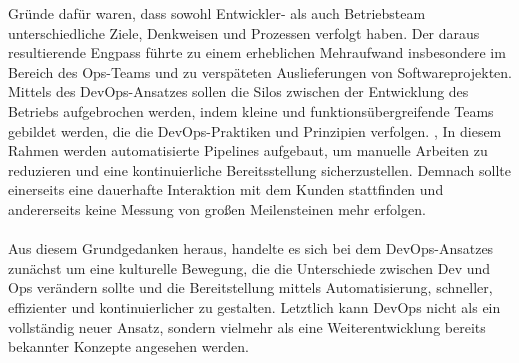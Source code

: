 Gründe dafür waren, dass sowohl Entwickler- als auch Betriebsteam unterschiedliche Ziele, Denkweisen und Prozessen verfolgt haben. \cite{wettinger_streamlining_2016} Der daraus resultierende Engpass führte zu einem erheblichen Mehraufwand insbesondere im Bereich des Ops-Teams und zu verspäteten Auslieferungen von Softwareprojekten. Mittels des DevOps-Ansatzes sollen die Silos zwischen der Entwicklung des Betriebs aufgebrochen werden, indem kleine und funktionsübergreifende Teams gebildet werden, die die DevOps-Praktiken und Prinzipien verfolgen. \cite{ebert_devops_2016}, \cite{wiedemann_research_2019} In diesem Rahmen werden automatisierte Pipelines aufgebaut, um manuelle Arbeiten zu reduzieren und eine kontinuierliche Bereitsstellung sicherzustellen. \cite[S.3,5]{verona_practical_2016} Demnach sollte einerseits eine dauerhafte Interaktion mit dem Kunden stattfinden und andererseits keine Messung von großen Meilensteinen mehr erfolgen. \cite[S.5]{sharma_devops_2017}\\\\ Aus diesem Grundgedanken heraus, handelte es sich bei dem DevOps-Ansatzes zunächst um eine kulturelle Bewegung, die die Unterschiede zwischen Dev und Ops verändern sollte und die Bereitstellung mittels Automatisierung, schneller, effizienter und kontinuierlicher zu gestalten. \cite[S.5]{sharma_devops_2017} Letztlich kann DevOps nicht als ein vollständig neuer Ansatz, sondern vielmehr als eine Weiterentwicklung bereits bekannter Konzepte angesehen werden. \cite[S. 23]{alt_innovationsorientiertes_2017}

